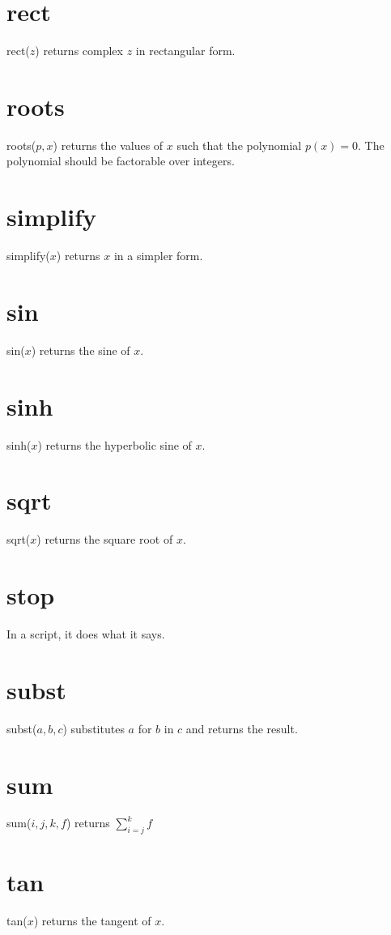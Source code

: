 \documentclass[11pt]{article}
\begin{document}
\section*{rect}
rect($z$) returns complex $z$ in rectangular form.

\section*{roots}
roots($p,x$) returns the values of $x$ such that the polynomial $p(x)=0$.
The polynomial should be factorable over integers.

\section*{simplify}
simplify($x$) returns $x$ in a simpler form.

\section*{sin}
sin($x$) returns the sine of $x$.

\section*{sinh}
sinh($x$) returns the hyperbolic sine of $x$.

\section*{sqrt}
sqrt($x$) returns the square root of $x$.

\section*{stop}
In a script, it does what it says.

\section*{subst}
subst($a,b,c$) substitutes $a$ for $b$ in $c$ and returns the result.

\section*{sum}
sum($i,j,k,f$) returns $\displaystyle\sum_{i=j}^k f$

\section*{tan}
tan($x$) returns the tangent of $x$.
\end{document}
